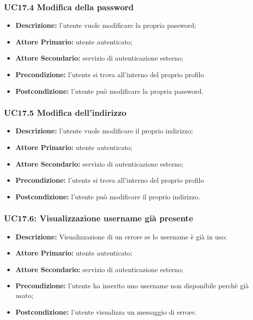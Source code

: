 \subsubsection{UC17.4 Modifica della password}
\label{sec:UC17.4}
\begin{itemize}
    \item \textbf{Descrizione:} l'utente vuole modificare la propria password;
    \item \textbf{Attore Primario:} utente autenticato;
    \item \textbf{Attore Secondario:} servizio di autenticazione esterno;
    \item \textbf{Precondizione:} l'utente si trova all'interno del proprio profilo
    \item \textbf{Postcondizione:} l'utente può modificare la propria password.
\end{itemize}

\subsubsection{UC17.5 Modifica dell'indirizzo}
\label{sec:UC17.5}
\begin{itemize}
    \item \textbf{Descrizione:} l'utente vuole modificare il proprio indirizzo;
    \item \textbf{Attore Primario:} utente autenticato;
    \item \textbf{Attore Secondario:} servizio di autenticazione esterno;
    \item \textbf{Precondizione:} l'utente si trova all'interno del proprio profilo
    \item \textbf{Postcondizione:} l'utente può modificare il proprio indirizzo.
\end{itemize}

\subsubsection{UC17.6: Visualizzazione username già presente}
\label{sec:UC17.6}
\begin{itemize}
    \item \textbf{Descrizione:} Visualizzazione di un errore se lo username è già in uso;
    \item \textbf{Attore Primario:} utente autenticato;
    \item \textbf{Attore Secondario:} servizio di autenticazione esterno;
    \item \textbf{Precondizione:} l'utente ha inserito uno username non disponibile perchè già usato;
    \item \textbf{Postcondizione:} l'utente visualizza un messaggio di errore.
\end{itemize}